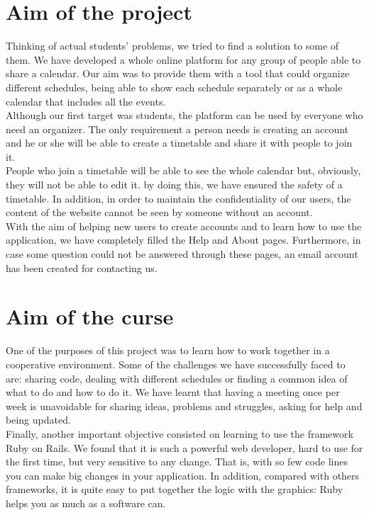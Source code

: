 


\section{Aim of the project}

Thinking of actual students' problems, we tried to find a solution to some of them. We have developed a whole  online platform for any group of people able to share a calendar. Our aim was to provide them with a tool that could organize  different schedules, being able to show each schedule separately or as a whole calendar that includes all the events.\\
Although our first target was students, the platform can be used by everyone who need an organizer. The only requirement a person needs is creating an account and he or she will be able to create a timetable and share it with people to join it.\\
People who join a timetable will be able to see the whole calendar but, obviously, they will not be able to edit it. by doing this, we have ensured the safety of a timetable.  In addition, in order to maintain the confidentiality of our users, the content of the website cannot be seen by someone without an account.\\
With the aim of helping new users to create accounts and to learn how to use the application, we have completely filled the Help and About pages. Furthermore, in case some question could not be answered through these pages, an email account has been created for contacting us.\\

\section{Aim of the curse}
One of the purposes of this project was to learn how to work together in a cooperative environment. Some of the challenges we have successfully faced to are: sharing code, dealing with different schedules or finding a common idea of what to do and how to do it. We have learnt that having a meeting once per week is unavoidable for sharing ideas, problems and struggles, asking for help and being updated.\\
Finally, another important objective consisted on learning to use the framework Ruby on Rails. We found that it is such a powerful web developer, hard to use for the first time, but very sensitive to any change. That is, with so few code lines you can make big changes in your application. In addition, compared with others frameworks, it is quite easy to put together the logic with the graphics: Ruby helps you as much as a software can.